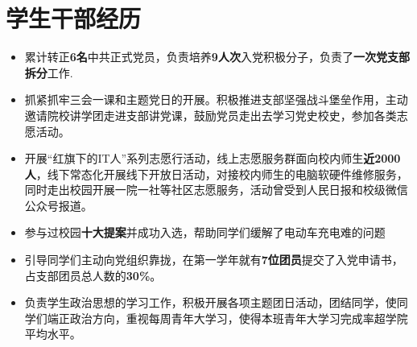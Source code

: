 \documentclass{resume} %
\begin{document}

\section{学生干部经历}
\begin{itemize}[parsep=0.5ex]
\item 累计转正\textbf{6名}中共正式党员，负责培养\textbf{9人次}入党积极分子，负责了\textbf{一次党支部拆分}工作.
\item 抓紧抓牢三会一课和主题党日的开展。积极推进支部坚强战斗堡垒作用，主动邀请院校讲学团走进支部讲党课，鼓励党员走出去学习党史校史，参加各类志愿活动。 %
\end{itemize}

\begin{itemize}[parsep=0.5ex]
\item 开展“红旗下的IT人”系列志愿行活动，线上志愿服务群面向校内师生\textbf{近2000人}，线下常态化开展线下开放日活动，对接校内师生的电脑软硬件维修服务，同时走出校园开展一院一社等社区志愿服务，活动曾受到人民日报和校级微信公众号报道。
\item 参与过校园\textbf{十大提案}并成功入选，帮助同学们缓解了电动车充电难的问题
\end{itemize}

\begin{itemize}[parsep=0.5ex]
\item 引导同学们主动向党组织靠拢，在第一学年就有\textbf{7位团员}提交了入党申请书，占支部团员总人数的\textbf{30\%}。
\item 负责学生政治思想的学习工作，积极开展各项主题团日活动，团结同学，使同学们端正政治方向，重视每周青年大学习，使得本班青年大学习完成率超学院平均水平。
\end{itemize}
\end{document}
